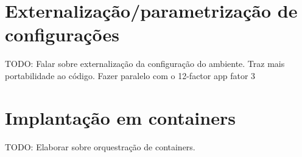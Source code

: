 





\section{Externalização/parametrização de configurações}
TODO: Falar sobre externalização da configuração do ambiente. Traz mais portabilidade ao código. Fazer paralelo com o 12-factor app fator 3

\section{Implantação em containers}
TODO: Elaborar sobre orquestração de containers.

